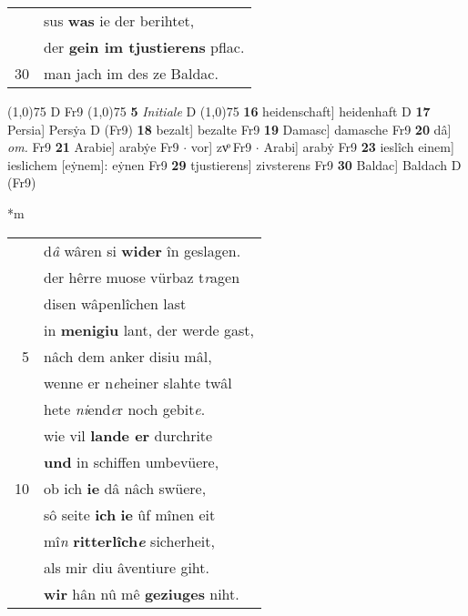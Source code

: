 \documentclass[8pt,a4paper,notitlepage]{article}
\begin{document}
\begin{table}[ht]
\begin{minipage}[t]{0.5\linewidth}
\begin{tabular}{rl}
 & sus \textbf{was} ie der berihtet,\\ 
 & der \textbf{gein im tjustierens} pflac.\\ 
30 & man jach im des ze Baldac.\\ 
\end{tabular}
\scriptsize
\line(1,0){75} \newline
D Fr9 \newline
\line(1,0){75} \newline
\textbf{5} \textit{Initiale} D  \newline
\line(1,0){75} \newline
\textbf{16} heidenschaft] heidenhaft D \textbf{17} Persia] Persẏa D (Fr9) \textbf{18} bezalt] bezalte Fr9 \textbf{19} Damasc] damasche Fr9 \textbf{20} dâ] \textit{om.} Fr9 \textbf{21} Arabie] arabẏe Fr9  $\cdot$ vor] zvͦ Fr9  $\cdot$ Arabi] arabẏ Fr9 \textbf{23} ieslîch einem] ieslichem [eẏnem]: eẏnen Fr9 \textbf{29} tjustierens] zivsterens Fr9 \textbf{30} Baldac] Baldach D (Fr9) \newline
\end{minipage}
\hspace{0.5cm}
\begin{minipage}[t]{0.5\linewidth}
\small
\begin{center}*m
\end{center}
\begin{tabular}{rl}
 & d\textit{â} wâren si \textbf{wider} în geslagen.\\ 
 & der hêrre muose vürbaz t\textit{r}agen\\ 
 & disen wâpenlîchen last\\ 
 & in \textbf{menigiu} lant, der werde gast,\\ 
5 & nâch dem anker disiu mâl,\\ 
 & wenne er n\textit{e}heiner slahte twâl\\ 
 & hete \textit{ni}end\textit{e}r noch gebit\textit{e}.\\ 
 & wie vil \textbf{lande er} durchrite\\ 
 & \textbf{und} in schiffen umbevüere,\\ 
10 & ob ich \textbf{ie} dâ nâch swüere,\\ 
 & sô seite \textbf{ich} \textbf{ie} ûf mînen eit\\ 
 & mî\textit{n} \textbf{ritterlîch\textit{e}} sicherheit,\\ 
 & als mir diu âventiure giht.\\ 
 & \textbf{wir} hân nû mê \textbf{geziuges} niht.\\ 

\end{tabular}
\end{minipage}
\end{table}
\end{document}
